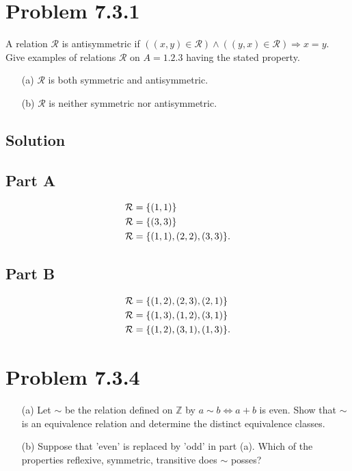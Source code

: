 \documentclass[12pt]{extarticle}
\begin{document}

\section*{Problem 7.3.1}

A relation $\mathcal{R}$ is antisymmetric if $((x, y) \in \mathcal{R}) \land ((y, x) \in \mathcal{R}) \Rightarrow x = y$. Give examples of relations $\mathcal{R}$ on $A = \qty{1, 2, 3}$ having the stated property.

\begin{enumerate}
	\item[(a)] $\mathcal{R}$ is both symmetric and antisymmetric. 
	\item[(b)] $\mathcal{R}$ is neither symmetric nor antisymmetric.
\end{enumerate}

\subsection*{Solution}
\begin{multicols}{2}
	\centering
	\subsection*{Part A}
	\begin{align*}
		\mathcal{R} &= \qty{(1,1)} \\
		\mathcal{R} &= \qty{(3,3)} \\
		\mathcal{R} &= \qty{(1,1), (2,2), (3,3)}
	.\end{align*}

	\columnbreak

	\centering
	\subsection*{Part B}
	\begin{align*}
		\mathcal{R} &= \qty{(1,2), (2,3), (2,1)} \\
		\mathcal{R} &= \qty{(1,3), (1,2), (3,1)} \\
		\mathcal{R} &= \qty{(1,2), (3,1), (1,3)}
	.\end{align*}
\end{multicols}

\section*{Problem 7.3.4}
\begin{enumerate}
	\item[(a)] Let $\sim$ be the relation defined on $\mathbb{Z}$ by $a \sim b \Longleftrightarrow a + b$ is even. Show that $\sim$ is an equivalence relation and determine the distinct equivalence classes.
	\item[(b)] Suppose that 'even' is replaced by 'odd' in part (a). Which of the properties reflexive, symmetric, transitive does $\sim$ posses?
\end{enumerate}
\end{document}
